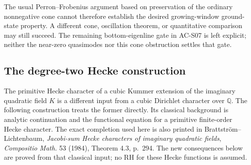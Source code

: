 The usual Perron--Frobenius argument based on preservation of the
ordinary nonnegative cone cannot therefore establish the desired
growing-window ground-state property.  A different cone,
oscillation theorem, or quantitative comparison may still succeed.
The remaining bottom-eigenline gate in AC-S07 is left explicit;
neither the near-zero quasimodes nor this cone obstruction settles
that gate.

\subsection{The degree-two Hecke construction}

The primitive Hecke character of a cubic Kummer extension of the
imaginary quadratic field \(K\) is a different input from a cubic
Dirichlet character over \(\mathbb Q\).  The following construction
treats the former directly.  Its classical background is analytic
continuation and the functional equation for a primitive finite-order
Hecke character.  The exact completion used here is also printed in
Brattstr\"om--Lichtenbaum, \emph{Jacobi-sum Hecke characters of imaginary
quadratic fields}, \emph{Compositio Math.} 53 (1984), Theorem 4.3,
p.~294.  The new consequences below are proved from that classical
input; no RH for these Hecke functions is assumed.

